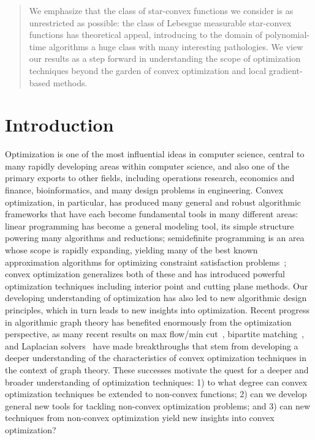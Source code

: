 \documentclass[11pt,letter]{article}
\numberwithin{nTheorems}{section}
\begin{document}
\begin{abstract}
We emphasize that the class of star-convex functions we consider is as unrestricted as possible: the class of Lebesgue measurable star-convex functions has theoretical appeal, introducing to the domain of polynomial-time algorithms a huge class with many interesting pathologies.
We view our results as a step forward in understanding the scope of optimization techniques beyond the garden of convex optimization and local gradient-based methods.




\end{abstract}
\thispagestyle{empty}\setcounter{page}{0}
\newpage
\section{Introduction}


Optimization is one of the most influential ideas in computer science, central to many rapidly developing areas within computer science, and also one of the primary exports to other fields, including operations research, economics and finance, bioinformatics, and many design problems in engineering. Convex optimization, in particular, has produced many general and robust algorithmic frameworks that have each become fundamental tools in many different areas: linear programming has become a general modeling tool, its simple structure powering many algorithms and reductions; semidefinite programming is an area whose scope is rapidly expanding, yielding many of the best known approximation algorithms for optimizing constraint satisfaction problems~\cite{chlamtac-tulsiani}; convex optimization generalizes both of these and has introduced powerful optimization techniques including interior point and cutting plane methods. Our developing understanding of optimization has also led to new algorithmic design principles, which in turn leads to new insights into optimization. Recent progress in algorithmic graph theory has benefited enormously from the optimization perspective, as many recent results on max flow/min cut~\cite{Madry:2013,Kelner:2014,Lee:2014,Christiano:2011,Sherman:2013}, bipartite matching~\cite{Madry:2013}, and Laplacian solvers~\cite{Vishnoi:2012,Christiano:2011,Spielman:2004} have made breakthroughs that stem from developing a deeper understanding of the characteristics of convex optimization techniques in the context of graph theory. These successes motivate the quest for a deeper and broader understanding of optimization techniques: 1) to what degree can convex optimization techniques be extended to non-convex functions; 2) can we develop general new tools for tackling non-convex optimization problems; and 3) can new techniques from non-convex optimization yield new insights into convex optimization?
\end{document}
